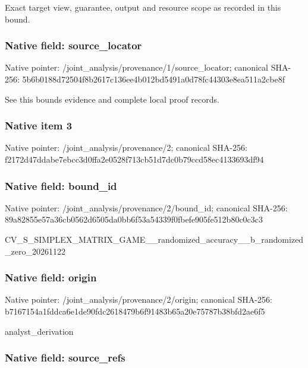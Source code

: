 \documentclass[10pt,a4paper]{article}
\begin{document}
Exact target view, guarantee, output and resource scope as recorded in this bound.


\subsubsection{Native field: source\_locator}


Native pointer: /joint\_analysis/provenan\allowbreak{}ce/1/source\_locator; canonical SHA-256: 5b6b0188d72504f8b2617c13\allowbreak{}6ee4b012bd5491a0d78fc443\allowbreak{}03e8ea511a2cbe8f


See this bounds evidence and complete local proof records.


\subsubsection{Native item 3}


Native pointer: /joint\_analysis/provenance/2; canonical SHA-256: f2172d47ddabe7ebcc3d0ffa\allowbreak{}2e0528f713cb51d7dc0b79cc\allowbreak{}d58ec4133693df94



\subsubsection{Native field: bound\_id}


Native pointer: /joint\_analysis/provenance/2/bound\_id; canonical SHA-256: 89a82855e57a36cb0562d650\allowbreak{}5da0bb6f53a54339f0fbefe9\allowbreak{}05fe512b80c0c3c3


CV\_S\_SIMPLEX\_MATRIX\_GAME\allowbreak{}\_\_randomized\_accuracy\_\_b\allowbreak{}\_randomized\_zero\_2026112\allowbreak{}2


\subsubsection{Native field: origin}


Native pointer: /joint\_analysis/provenance/2/origin; canonical SHA-256: b7167154a1fddca6e1de90fd\allowbreak{}c2618479b6f91483b65a20e7\allowbreak{}5787b38bfd2ae6f5


analyst\_derivation


\subsubsection{Native field: source\_refs}
\end{document}
